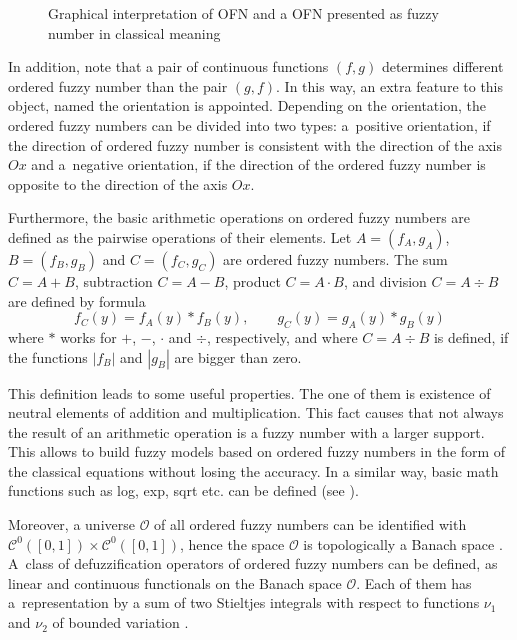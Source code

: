 \documentclass[review]{elsarticle}
\begin{document}
\begin{figure}[!ht]
\centering
\vspace{-25pt}
\caption{Graphical interpretation of OFN and a OFN presented as fuzzy number in classical meaning}
\label{fig:1}
\end{figure}

In addition, note that a pair of continuous functions $(f,g)$ determines different ordered fuzzy number than the pair $(g,f)$. In this way, an extra feature to this object, named the orientation is appointed. Depending on the orientation, the ordered fuzzy numbers can be divided into two types: a~positive orientation, if the direction of ordered fuzzy number is consistent with the direction of the axis $Ox$ and a~negative orientation, if the direction of the ordered fuzzy number is opposite to the direction of the axis $Ox$.

Furthermore, the basic arithmetic operations on ordered fuzzy numbers are defined as the pairwise operations of their elements. Let $A=(f_A,g_A)$, \linebreak $B=(f_B,g_B)$ and $C=(f_C,g_C)$ are ordered fuzzy numbers. The sum \linebreak $C=A+B$, subtraction $C=A-B$, product $C= A\cdot B$, and division $C=A\div B$ are defined by formula
\begin{equation}
f_C(y)=f_A(y)\ast f_B(y),\qquad g_C(y)=g_A(y)\ast g_B(y)
\end{equation}
where $\ast$ works for $+$, $-$, $\cdot$ and $\div$, respectively, and where $C=A\div B$ is defined, if the functions $|f_B|$ and $|g_B|$ are bigger than zero. 

This definition leads to some useful properties. The one of them is existence of neutral elements of addition and multiplication. This fact causes that not always the result of an arithmetic operation is a fuzzy number with a larger support. This allows to build fuzzy models based on ordered fuzzy numbers in the form of the classical equations without losing the accuracy. In a similar way, basic math functions such as log, exp, sqrt etc. can be defined (see \cite{prokopowicz}).

Moreover, a universe $\mathcal{O}$ of all ordered fuzzy numbers can be identified with $\mathcal{C}^0([0,1])\times\mathcal{C}^0([0,1])$, hence the space $\mathcal{O}$ is topologically a Banach space \cite{kos2004}. A~class of defuzzification operators of ordered fuzzy numbers can be defined, as linear and continuous functionals on the Banach space $\mathcal{O}$. Each of them has a~representation by a sum of two Stieltjes integrals with respect to functions $\nu_1$ and $\nu_2$ of bounded variation \cite{kos2010,kos2013}.
\end{document}
